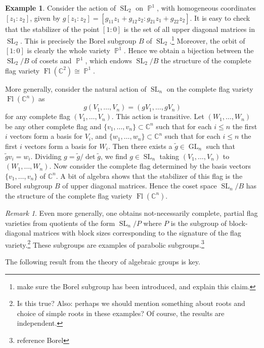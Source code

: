 \documentclass{article}
\newcommand{\C}{\mathbb{C}}
\theoremstyle{plain}
\theoremstyle{definition}
\newtheorem{example}[theorem]{Example}
\theoremstyle{remark}
\newtheorem*{remark}{Remark}
\DeclareMathOperator{\Fl}{Fl}
\DeclareMathOperator{\PP}{\mathbb{P}}
\DeclareMathOperator{\SL}{SL}
\DeclareMathOperator{\GL}{GL}
\begin{document}
\begin{example}
    \label{ex:flag}
    Consider the action of $\SL_2$ on $\PP^1$, with homogeneous coordinates $[z_1:z_2]$,
    given by $g[z_1:z_2]=[g_{11}z_1+g_{12}z_2:g_{21}z_1+g_{22}z_2]$. It is easy to check
    that the stabilizer of the point $[1:0]$ is the set of all upper diagonal matrices in
    $\SL_2$. This is precisely the Borel subgroup $B$ of $\SL_2$.\footnote{make sure the
    Borel subgroup has been introduced, and explain this claim.} Moreover, the orbit of $[1:0]$
    is clearly the whole variety $\PP^1$. Hence we obtain a bijection between the $\SL_2/B$ of
    cosets and $\PP^1$, which endows $\SL_2/B$ the structure of the complete flag variety
    $\Fl(\C^2)\cong\PP^1$.

    More generally, consider the natural action of $\SL_n$ on the complete flag variety
    $\Fl(\C^n)$ as
    \[g(V_1,\ldots, V_n) = (gV_1,\ldots, gV_n)\]
    for any complete flag $(V_1,\ldots,V_n)$. This action is transitive. Let $(W_1,\ldots,W_n)$ be
    any other complete flag and $\{v_1,\ldots,v_n\}\subset \C^n$ such that for each $i\leqslant n$
    the first $i$ vectors form a basis for $V_i$, and $\{w_1,\ldots,w_n\}\subset \C^n$ such that
    for each $i\leqslant n$ the first $i$ vectors form a basis for $W_i$. Then there exists
    a $\tilde g\in\GL_n$ such that $\tilde gv_i=w_i$. Dividing $g=\tilde g/\det \tilde g$,
    we find $g\in\SL_n$ taking $(V_1,\ldots,V_n)$ to $(W_1,\ldots,W_n)$. Now consider the
    complete flag determined by the basis vectors $\{v_1,\ldots,v_n\}$ of $\C^n$. A bit of algebra
    shows that the stabilizer of this flag is the Borel subgroup $B$ of upper diagonal
    matrices. Hence the coset space $\SL_n/B$ has the structure of the complete flag variety
    $\Fl(\C^n)$.
\end{example}

\begin{remark}
    Even more generally, one obtains not-necessarily complete, partial flag varieties
    from quotients of the form $\SL_n/P$ where $P$ is the subgroup of block-diagonal
    matrices with block sizes corresponding to the signature of the flag variety.\footnote{Is
    this true? Also: perhaps we should mention something about roots and choice of simple
    roots in these examples? Of course, the results are independent.} These subgroups
    are examples of parabolic subgroups.\footnote{reference Borel}
\end{remark}

The following result from the theory of algebraic groups is key.
\end{document}
